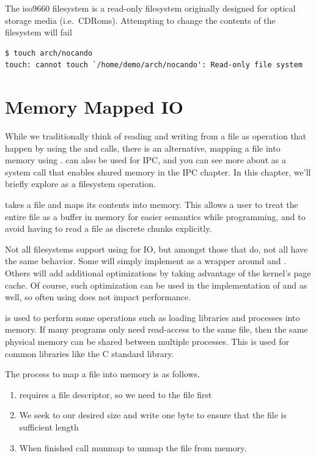 The iso9660 filesystem is a read-only filesystem originally designed for optical storage media (i.e.~CDRoms).
Attempting to change the contents of the filesystem will fail

\begin{verbatim}
$ touch arch/nocando
touch: cannot touch `/home/demo/arch/nocando': Read-only file system
\end{verbatim}

\section{Memory Mapped IO}

While we traditionally think of reading and writing from a file as operation that happen by using the  and  calls, there is an alternative, mapping a file into memory using .
 can also be used for IPC, and you can see more about  as a system call that enables shared memory in the IPC chapter.
In this chapter, we'll briefly explore  as a filesystem operation.

 takes a file and maps its contents into memory.
This allows a user to treat the entire file as a buffer in memory for easier semantics while programming, and to avoid having to read a file as discrete chunks explicitly.

Not all filesystems support using  for IO, but amongst those that do, not all have the same behavior.
Some will simply implement  as a wrapper around  and .
Others will add additional optimizations by taking advantage of the kernel's page cache.
Of course, such optimization can be used in the implementation of  and  as well, so often using  does not impact performance.

 is used to perform some operations such as loading libraries and processes into memory.
If many programs only need read-access to the same file, then the same physical memory can be shared between multiple processes.
This is used for common libraries like the C standard library.

The process to map a file into memory is as follows.

\begin{enumerate}
\item {} requires a file descriptor, so we need to  the file first
\item We seek to our desired size and write one byte to ensure that the file is sufficient length
\item When finished call munmap to unmap the file from memory.
\end{enumerate}

